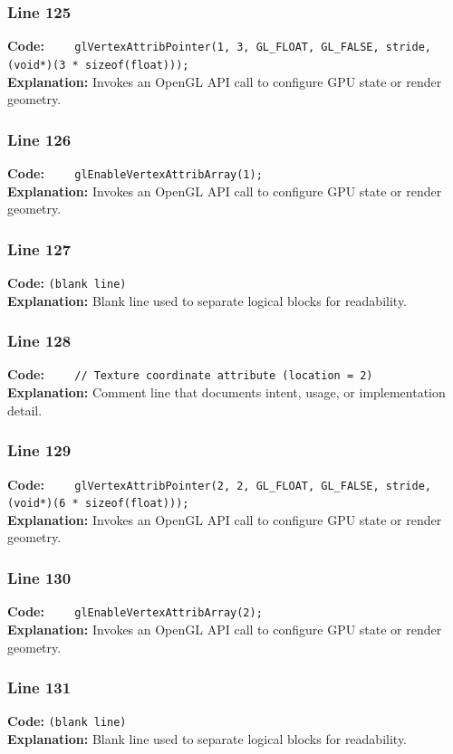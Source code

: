 \documentclass[11pt,a4paper]{article}
\begin{document}
\subsubsection*{Line 125}
\textbf{Code:} \verb|    glVertexAttribPointer(1, 3, GL_FLOAT, GL_FALSE, stride, (void*)(3 * sizeof(float)));|\\
\textbf{Explanation:} Invokes an OpenGL API call to configure GPU state or render geometry.

\subsubsection*{Line 126}
\textbf{Code:} \verb|    glEnableVertexAttribArray(1);|\\
\textbf{Explanation:} Invokes an OpenGL API call to configure GPU state or render geometry.

\subsubsection*{Line 127}
\textbf{Code:} \texttt{(blank line)}\\
\textbf{Explanation:} Blank line used to separate logical blocks for readability.

\subsubsection*{Line 128}
\textbf{Code:} \verb|    // Texture coordinate attribute (location = 2)|\\
\textbf{Explanation:} Comment line that documents intent, usage, or implementation detail.

\subsubsection*{Line 129}
\textbf{Code:} \verb|    glVertexAttribPointer(2, 2, GL_FLOAT, GL_FALSE, stride, (void*)(6 * sizeof(float)));|\\
\textbf{Explanation:} Invokes an OpenGL API call to configure GPU state or render geometry.

\subsubsection*{Line 130}
\textbf{Code:} \verb|    glEnableVertexAttribArray(2);|\\
\textbf{Explanation:} Invokes an OpenGL API call to configure GPU state or render geometry.

\subsubsection*{Line 131}
\textbf{Code:} \texttt{(blank line)}\\
\textbf{Explanation:} Blank line used to separate logical blocks for readability.
\end{document}

